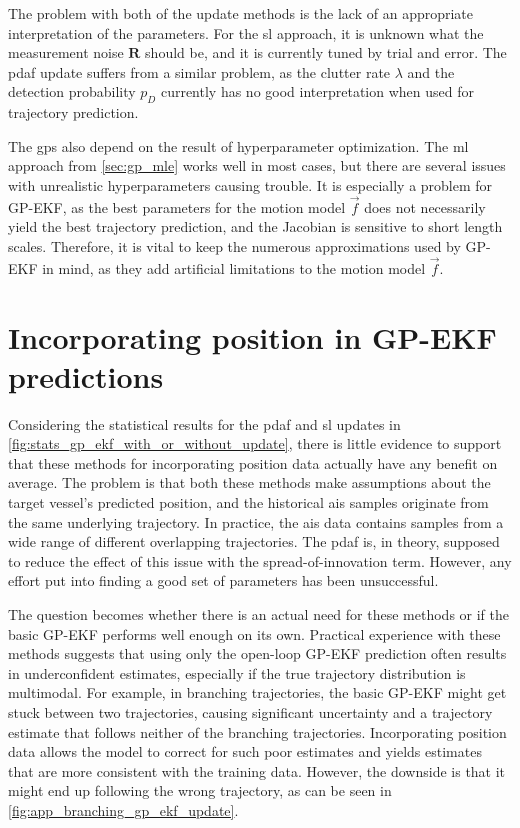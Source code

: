 The problem with both of the update methods is the lack of an appropriate interpretation of the parameters. For the \acrshort{sl} approach, it is unknown what the measurement noise $\boldsymbol{R}$ should be, and it is currently tuned by trial and error. The \acrshort{pdaf} update suffers from a similar problem, as the clutter rate $\lambda$ and the detection probability $p_D$ currently has no good interpretation when used for trajectory prediction. 

The \acrshort{gp}s also depend on the result of hyperparameter optimization. The \acrshort{ml} approach from \cref{sec:gp_mle} works well in most cases, but there are several issues with unrealistic hyperparameters causing trouble. It is especially a problem for GP-EKF, as the best parameters for the motion model $\vec{f}$ does not necessarily yield the best trajectory prediction, and the Jacobian is sensitive to short length scales. Therefore, it is vital to keep the numerous approximations used by GP-EKF in mind, as they add artificial limitations to the motion model $\vec{f}$.

\section{Incorporating position in GP-EKF predictions}
Considering the statistical results for the \acrshort{pdaf} and \acrshort{sl} updates in \cref{fig:stats_gp_ekf_with_or_without_update}, there is little evidence to support that these methods for incorporating position data actually have any benefit on average. The problem is that both these methods make assumptions about the target vessel's predicted position, and the historical \acrshort{ais} samples originate from the same underlying trajectory. In practice, the \acrshort{ais} data contains samples from a wide range of different overlapping trajectories. The \acrshort{pdaf} is, in theory, supposed to reduce the effect of this issue with the spread-of-innovation term. However, any effort put into finding a good set of parameters has been unsuccessful. 

The question becomes whether there is an actual need for these methods or if the basic GP-EKF performs well enough on its own. Practical experience with these methods suggests that using only the open-loop GP-EKF prediction often results in underconfident estimates, especially if the true trajectory distribution is multimodal. For example, in branching trajectories, the basic GP-EKF might get stuck between two trajectories, causing significant uncertainty and a trajectory estimate that follows neither of the branching trajectories. Incorporating position data allows the model to correct for such poor estimates and yields estimates that are more consistent with the training data. However, the downside is that it might end up following the wrong trajectory, as can be seen in \cref{fig:app_branching_gp_ekf_update}.

